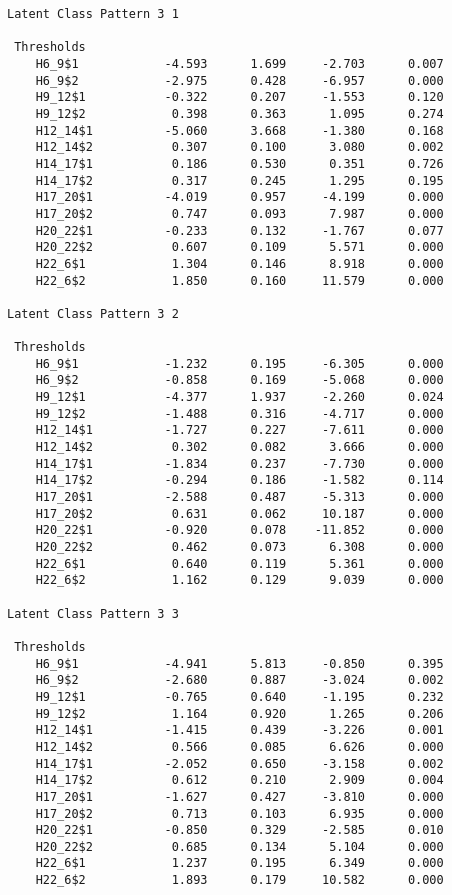 \documentclass[]{article}
\begin{document}
\begin{verbatim}
Latent Class Pattern 3 1

 Thresholds
    H6_9$1            -4.593      1.699     -2.703      0.007
    H6_9$2            -2.975      0.428     -6.957      0.000
    H9_12$1           -0.322      0.207     -1.553      0.120
    H9_12$2            0.398      0.363      1.095      0.274
    H12_14$1          -5.060      3.668     -1.380      0.168
    H12_14$2           0.307      0.100      3.080      0.002
    H14_17$1           0.186      0.530      0.351      0.726
    H14_17$2           0.317      0.245      1.295      0.195
    H17_20$1          -4.019      0.957     -4.199      0.000
    H17_20$2           0.747      0.093      7.987      0.000
    H20_22$1          -0.233      0.132     -1.767      0.077
    H20_22$2           0.607      0.109      5.571      0.000
    H22_6$1            1.304      0.146      8.918      0.000
    H22_6$2            1.850      0.160     11.579      0.000

Latent Class Pattern 3 2

 Thresholds
    H6_9$1            -1.232      0.195     -6.305      0.000
    H6_9$2            -0.858      0.169     -5.068      0.000
    H9_12$1           -4.377      1.937     -2.260      0.024
    H9_12$2           -1.488      0.316     -4.717      0.000
    H12_14$1          -1.727      0.227     -7.611      0.000
    H12_14$2           0.302      0.082      3.666      0.000
    H14_17$1          -1.834      0.237     -7.730      0.000
    H14_17$2          -0.294      0.186     -1.582      0.114
    H17_20$1          -2.588      0.487     -5.313      0.000
    H17_20$2           0.631      0.062     10.187      0.000
    H20_22$1          -0.920      0.078    -11.852      0.000
    H20_22$2           0.462      0.073      6.308      0.000
    H22_6$1            0.640      0.119      5.361      0.000
    H22_6$2            1.162      0.129      9.039      0.000

Latent Class Pattern 3 3

 Thresholds
    H6_9$1            -4.941      5.813     -0.850      0.395
    H6_9$2            -2.680      0.887     -3.024      0.002
    H9_12$1           -0.765      0.640     -1.195      0.232
    H9_12$2            1.164      0.920      1.265      0.206
    H12_14$1          -1.415      0.439     -3.226      0.001
    H12_14$2           0.566      0.085      6.626      0.000
    H14_17$1          -2.052      0.650     -3.158      0.002
    H14_17$2           0.612      0.210      2.909      0.004
    H17_20$1          -1.627      0.427     -3.810      0.000
    H17_20$2           0.713      0.103      6.935      0.000
    H20_22$1          -0.850      0.329     -2.585      0.010
    H20_22$2           0.685      0.134      5.104      0.000
    H22_6$1            1.237      0.195      6.349      0.000
    H22_6$2            1.893      0.179     10.582      0.000


\end{verbatim}
\end{document}
